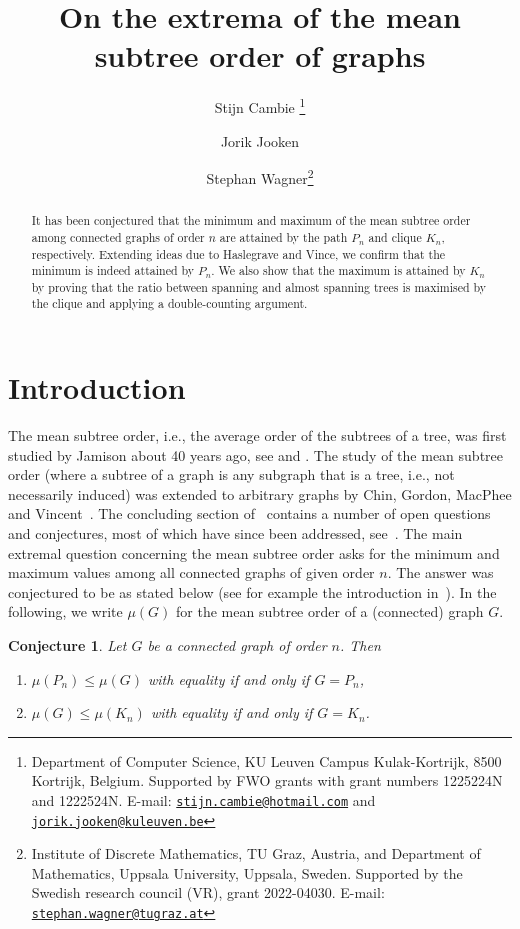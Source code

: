 \documentclass[11pt]{article}
\title{
On the extrema of the mean subtree order of graphs}
\author{
Stijn Cambie \thanks{Department of Computer Science, KU Leuven Campus Kulak-Kortrijk, 8500 Kortrijk, Belgium. Supported by FWO grants with grant numbers 1225224N and 1222524N. E-mail: \protect\href{mailto:stijn.cambie@hotmail.com}{\protect\nolinkurl{stijn.cambie@hotmail.com}} and \protect\href{mailto: 
                jorik.jooken@kuleuven.be}{\protect\nolinkurl{jorik.jooken@kuleuven.be}}}
\and
Jorik Jooken \footnotemark[1] \and Stephan Wagner\thanks{Institute of Discrete Mathematics, TU Graz, Austria, and Department of Mathematics, Uppsala University, Uppsala, Sweden. Supported by the Swedish research council (VR), grant 2022-04030. E-mail: \protect\href{mailto:stephan.wagner@tugraz.at}{\protect\nolinkurl{stephan.wagner@tugraz.at}}}
		}
\newtheorem{conj}[thr]{Conjecture}
\theoremstyle{definition}
\begin{document}
\maketitle



\begin{abstract}
 It has been conjectured that the minimum and maximum of the mean subtree order among connected graphs of order $n$ are attained by the path $P_n$ and clique $K_n$, respectively. Extending ideas due to Haslegrave and Vince, we confirm that the minimum is indeed attained by $P_n$. 
We also show that the maximum is attained by $K_n$ by proving that the ratio between spanning and almost spanning trees is maximised by the clique and applying a double-counting argument.
\end{abstract}

\section{Introduction}

The mean subtree order, i.e., the average order of the subtrees of a tree, was first studied by Jamison about 40 years ago, see \cite{jamison_average_1983} and \cite{jamison_monotonicity_1984}.
The study of the mean subtree order (where a subtree of a graph is any subgraph that is a tree, i.e., not necessarily induced) was extended to arbitrary graphs by Chin, Gordon, MacPhee and Vincent~\cite{CGMV18}. The concluding section of~\cite{CGMV18} contains a number of open questions and conjectures, most of which have since been addressed, see~\cite{CM21, LXT24, Wagner21_prob_spanning}.
The main extremal question concerning the mean subtree order asks for the minimum and maximum values among all connected graphs of given order $n$. The answer was conjectured to be as stated below (see for example the introduction in~\cite{John22b}). In the following, we write $\mu(G)$ for the mean subtree order of a (connected) graph $G$.

\begin{conj}\label{conj:main}
 Let $G$ be a connected graph of order $n$. Then 
 \begin{enumerate}
 \item\label{itm:min_Pn} $\mu(P_n) \le \mu(G)$ with equality if and only if $G=P_n$,
 \item\label{itm:max_Kn} $\mu(G) \le \mu(K_n)$ with equality if and only if $G=K_n$.
 \end{enumerate}
\end{conj}
\end{document}
